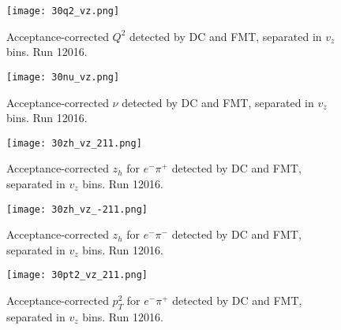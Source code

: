     \begin{figure}
        \centering
        \texttt{[image: 30q2\_vz.png]}
        \caption[Acceptance-corrected $Q^2$ separated in $v_z$ bins, run 12016]
        {Acceptance-corrected $Q^2$ detected by DC and FMT, separated in $v_z$ bins.
        Run 12016.}
        \label{fig::14.30::q2_vz}
    \end{figure}

    \begin{figure}
        \centering
        \texttt{[image: 30nu\_vz.png]}
        \caption[Acceptance-corrected $\nu$ separated in $v_z$ bins, run 12016]
        {Acceptance-corrected $\nu$ detected by DC and FMT, separated in $v_z$ bins.
        Run 12016.}
        \label{fig::14.30::nu_vz}
    \end{figure}

    \begin{figure}
        \centering
        \texttt{[image: 30zh\_vz\_211.png]}
        \caption[Acceptance-corrected $z_h$ for $e^-\pi^+$ separated in $v_z$ bins, run 12016]
        {Acceptance-corrected $z_h$ for $e^-\pi^+$ detected by DC and FMT, separated in $v_z$ bins.
        Run 12016.}
        \label{fig::14.30::zh_211_vz}
    \end{figure}

    \begin{figure}
        \centering
        \texttt{[image: 30zh\_vz\_-211.png]}
        \caption[Acceptance-corrected $z_h$ for $e^-\pi^-$ separated in $v_z$ bins, run 12016]
        {Acceptance-corrected $z_h$ for $e^-\pi^-$ detected by DC and FMT, separated in $v_z$ bins.
        Run 12016.}
        \label{fig::14.30::zh_-211_vz}
    \end{figure}

    \begin{figure}
        \centering
        \texttt{[image: 30pt2\_vz\_211.png]}
        \caption[Acceptance-corrected $p_T^2$ for $e^-\pi^+$ separated in $v_z$ bins, run 12016]
        {Acceptance-corrected $p_T^2$ for $e^-\pi^+$ detected by DC and FMT, separated in $v_z$ bins.
        Run 12016.}
        \label{fig::14.30::pt2_211_vz}
    \end{figure}

